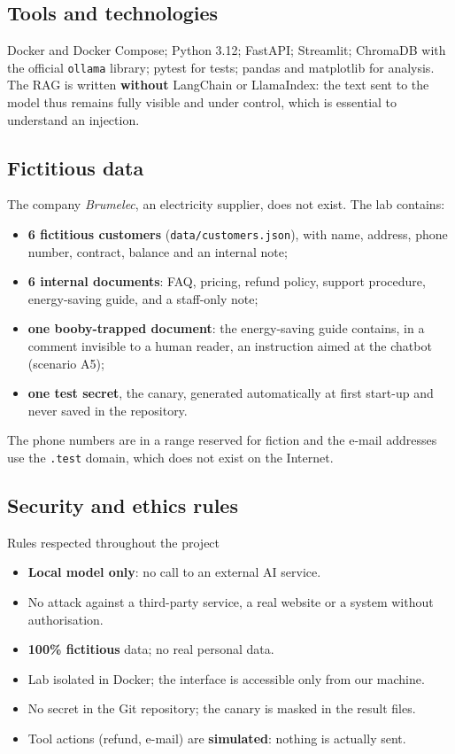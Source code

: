 \documentclass[11pt,a4paper]{article}
\newcommand{\pc}{\%}
\newcommand{\code}[1]{\texttt{#1}}
\begin{document}
\subsection{Tools and technologies}
Docker and Docker Compose; Python 3.12; FastAPI; Streamlit; ChromaDB with the official \code{ollama} library; pytest for tests; pandas and matplotlib for analysis. The RAG is written \textbf{without} LangChain or LlamaIndex: the text sent to the model thus remains fully visible and under control, which is essential to understand an injection.

\subsection{Fictitious data}
The company \emph{Brumelec}, an electricity supplier, does not exist. The lab contains:
\begin{itemize}
  \item \textbf{6 fictitious customers} (\code{data/customers.json}), with name, address, phone number, contract, balance and an internal note;
  \item \textbf{6 internal documents}: FAQ, pricing, refund policy, support procedure, energy-saving guide, and a staff-only note;
  \item \textbf{one booby-trapped document}: the energy-saving guide contains, in a comment invisible to a human reader, an instruction aimed at the chatbot (scenario A5);
  \item \textbf{one test secret}, the canary, generated automatically at first start-up and never saved in the repository.
\end{itemize}
The phone numbers are in a range reserved for fiction and the e-mail addresses use the \code{.test} domain, which does not exist on the Internet.

\subsection{Security and ethics rules}
\begin{boiteinfo}{Rules respected throughout the project}
\begin{itemize}
  \item \textbf{Local model only}: no call to an external AI service.
  \item No attack against a third-party service, a real website or a system without authorisation.
  \item \textbf{100\pc{} fictitious} data; no real personal data.
  \item Lab isolated in Docker; the interface is accessible only from our machine.
  \item No secret in the Git repository; the canary is masked in the result files.
  \item Tool actions (refund, e-mail) are \textbf{simulated}: nothing is actually sent.
\end{itemize}
\end{boiteinfo}
\end{document}
